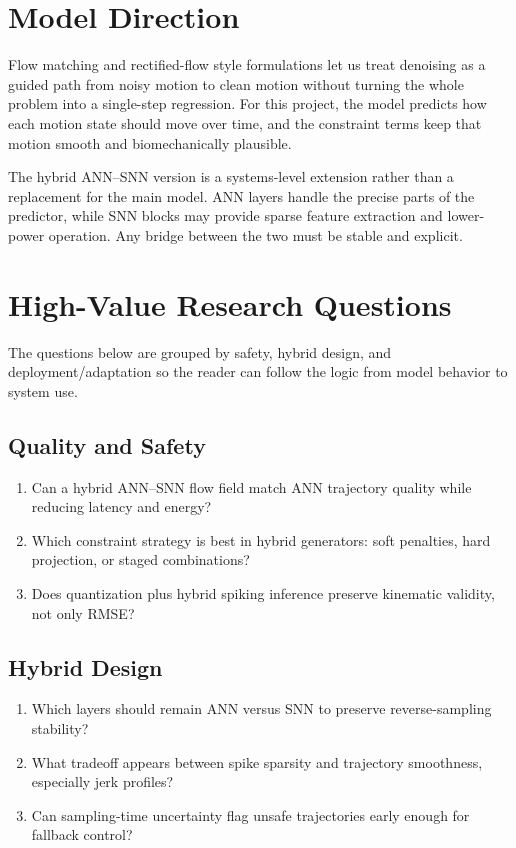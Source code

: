 \documentclass[11pt]{article}
\begin{document}
\section{Model Direction}
Flow matching and rectified-flow style formulations let us treat denoising as a guided path from noisy motion to clean motion without turning the whole problem into a single-step regression. For this project, the model predicts how each motion state should move over time, and the constraint terms keep that motion smooth and biomechanically plausible.

The hybrid ANN--SNN version is a systems-level extension rather than a replacement for the main model. ANN layers handle the precise parts of the predictor, while SNN blocks may provide sparse feature extraction and lower-power operation. Any bridge between the two must be stable and explicit.

\section{High-Value Research Questions}
The questions below are grouped by safety, hybrid design, and deployment/adaptation so the reader can follow the logic from model behavior to system use.

\subsection*{Quality and Safety}
\begin{enumerate}
  \item Can a hybrid ANN--SNN flow field match ANN trajectory quality while reducing latency and energy?
  \item Which constraint strategy is best in hybrid generators: soft penalties, hard projection, or staged combinations?
  \item Does quantization plus hybrid spiking inference preserve kinematic validity, not only RMSE?
\end{enumerate}

\subsection*{Hybrid Design}
\begin{enumerate}
  \item Which layers should remain ANN versus SNN to preserve reverse-sampling stability?
  \item What tradeoff appears between spike sparsity and trajectory smoothness, especially jerk profiles?
  \item Can sampling-time uncertainty flag unsafe trajectories early enough for fallback control?
\end{enumerate}
\end{document}
